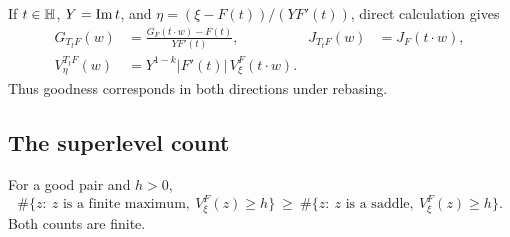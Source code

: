 If \(t\in\mathbb H\), \(Y=\operatorname{Im} t\), and
\(\eta=(\xi-F(t))/(YF'(t))\), direct calculation gives
\begin{align}
 G_{T_tF}(w)&=\frac{G_F(t\cdot w)-F(t)}{YF'(t)},&
 J_{T_tF}(w)&=J_F(t\cdot w),\label{eq:G-action}\\
 V_\eta^{T_tF}(w)&=Y^{1-k}|F'(t)|\,V_\xi^F(t\cdot w).
 &&\label{eq:V-action}
\end{align}
Thus goodness corresponds in both directions under rebasing.

\subsection{The superlevel count}

\begin{lemma}\label{lem:count}
For a good pair and \(h>0\),
\begin{equation}\label{eq:count}
 \#\{z:\ z\text{ is a finite maximum},\ V_\xi^F(z)\ge h\}
 \ \ge\
 \#\{z:\ z\text{ is a saddle},\ V_\xi^F(z)\ge h\}.
\end{equation}
Both counts are finite.
\end{lemma}
